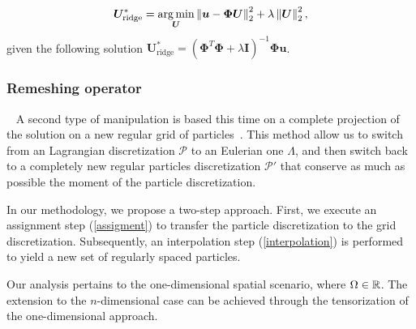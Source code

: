 \begin{equation*}
	\bm{U}_{\text{ridge}}^* = \operatorname*{arg\,min}_{\bm{U}} \left\lVert \bm{u} - \bm \Phi \bm{U} \right\rVert_2^2 + \lambda \left\lVert \bm{U} \right\rVert^2_2,
\end{equation*}given the following solution $\bm{U}^*_{\text{ridge}} = (\bm \Phi^T \bm \Phi + \lambda \bm I)^{-1} \bm \Phi \bm{u}$.

\subsubsection{Remeshing operator}~\label{remesh_part}
A second type of manipulation is based this time on a complete projection of the solution on a new regular grid of particles~\cite{cottet_vortex_2000,cottet_multi-purpose_1999}. This method allow us to switch from an Lagrangian discretization $\mathcal P$ to an Eulerian one $\Lambda$, and then switch back to a completely new regular particles discretization $\mathcal P'$ that conserve as much as possible the moment of the particle discretization.

In our methodology, we propose a two-step approach. First, we execute an assignment step (\ref{assigment}) to transfer the particle discretization to the grid discretization. Subsequently, an interpolation step (\ref{interpolation}) is performed to yield a new set of regularly spaced particles.

Our analysis pertains to the one-dimensional spatial scenario, where $\Omega \in \mathbb{R}$. The extension to the $n$-dimensional case can be achieved through the tensorization of the one-dimensional approach.

